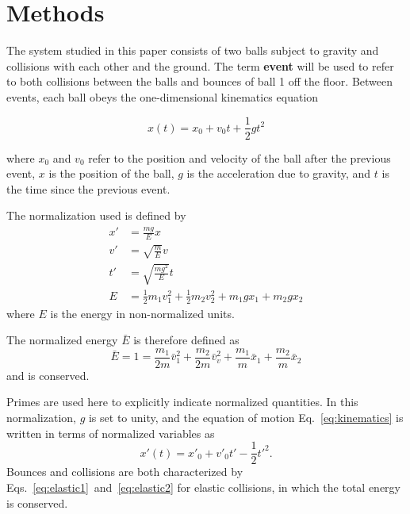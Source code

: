 \documentclass[pra,twocolumn,showpacs,amsmath,amssymb, aps, 10pt]{revtex4-1}
\begin{document}
\section{Methods} \label{sec:methods}

The system studied in this paper consists of two balls subject to gravity and
collisions with each other and the ground. The term \textbf{event} will be used
to refer to both collisions between the balls and bounces of ball 1
off the floor. Between events, each
ball obeys the one-dimensional kinematics equation

\begin{equation}
  x(t) = x_0 + v_0 t + \frac{1}{2} g t^2
  \label{eq:kinematics}
\end{equation}

where $x_0$ and $v_0$ refer to the position and velocity
of the ball after the previous event, $x$ is the position of the ball,
$g$ is the acceleration due to gravity, and $t$ is the time since the previous
event. %

The normalization used is defined by
\begin{align}
x' &= \frac{mg}{E} x \\
v' &= \sqrt{\frac{m}{E}} v \\
t' &= \sqrt{\frac{mg^2}{E}} t \\
E &= \frac{1}{2} m_1 v_1^2 + \frac{1}{2} m_2 v_2^2 + m_1 g x_1 + m_2 g x_2
\label{eq:normalization}
\end{align}
where $E$ is the energy in non-normalized units.\cite{assignment}

The normalized energy $\bar E$ is therefore defined as
\begin{equation}
  \bar E = 1 = \frac{m_1}{2 m} \bar v_1^2
  + \frac{m_2}{2 m} \bar v_v^2
  + \frac{m_1}{m}\bar x_1
  + \frac{m_2}{m}\bar x_2
\end{equation}
and is conserved.

Primes are used here to explicitly indicate normalized quantities.
In this normalization, $g$ is set to unity, and the equation of motion
Eq.~\ref{eq:kinematics} is written in terms of normalized variables as
\begin{equation}
x'(t) = x'_0 + v'_0 t' - \frac{1}{2} t'^2.
\label{eq:kinematics_normalized}
\end{equation}
Bounces and collisions are both characterized by
 Eqs.~\ref{eq:elastic1}~and~\ref{eq:elastic2} for elastic collisions, in which
the total energy is conserved.
\end{document}
